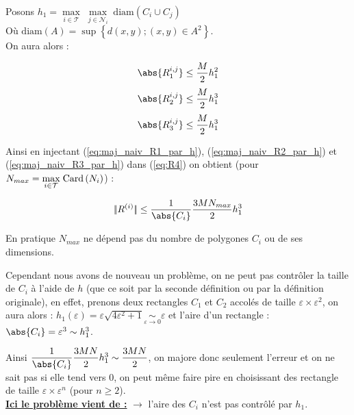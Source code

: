 \documentclass[12pt,a4paper]{article}
\begin{document}
	\noindent Posons $h_1 = \underset{i\in\mathcal T}\max\;\underset{j\in \mathcal N_i}\max\;\mathrm{diam}\left(C_i\cup C_j\right)$ \\
	Où $\mathrm{diam}(A) = \sup\left\{d(x,y); (x,y)\in A^2\right\}$.\\
	On aura alors :
	
	\begin{equation}\label{eq:maj_naiv_R1_par_h}
		\abs{R_1^{i,j}} \leq \dfrac {M}2h_1^2
	\end{equation}
	\begin{equation}\label{eq:maj_naiv_R2_par_h}
		\abs{R_2^{i,j}} \leq \dfrac{M}2h_1^3
	\end{equation}
	\begin{equation}\label{eq:maj_naiv_R3_par_h}
		\abs{R_3^{i,j}} \leq \dfrac{M}2 h_1^3
	\end{equation}
	
	
	Ainsi en injectant (\ref{eq:maj_naiv_R1_par_h}), (\ref{eq:maj_naiv_R2_par_h}) et (\ref{eq:maj_naiv_R3_par_h}) dans (\ref{eq:R4}) on obtient (pour $N_{max} = \underset{i\in\mathcal T}\max \hspace{.1cm}\text{Card}\left(N_i\right)$) :
	
	\begin{equation}\label{eq:max_naiv_R4}
		|\!| {R^{(i)}}|\!| \leq \frac1{\abs{C_i}}\frac{3MN_{max}}2h_1^3
	\end{equation}
	
	\vspace{-.2cm}
	
	En pratique $N_{max}$ ne dépend pas du nombre de polygones $C_i$ ou de ses dimensions.
	
	Cependant nous avons de nouveau un problème, on ne peut pas contrôler la taille de $C_i$ à l'aide de $h$ (que ce soit par la seconde définition ou par la définition originale), en effet, prenons deux rectangles $C_1$ et $C_2$ accolés de taille $\varepsilon\times\varepsilon^2$, on aura alors : $h_1(\varepsilon) = \varepsilon\sqrt{4\varepsilon^2+1} \underset{\varepsilon\to0}\sim \varepsilon$ et l'aire d'un rectangle : $\abs{C_i} = \varepsilon^3 \sim h_1^3$. 
	\par Ainsi $\dfrac1{\abs{C_i}}\dfrac{3MN}2h_1^3 \sim \dfrac{3MN}2$, on majore donc seulement l'erreur et on ne sait pas si elle tend vers 0, on peut même faire pire en choisissant des rectangle de taille $\varepsilon\times\varepsilon^n$ (pour $n \geq 2$).\\
	
	\textbf{\underline{Ici le problème vient de :}} $\longrightarrow$  l'aire des $C_i$ n'est pas contrôlé par $h_1$.\\
	
\end{document}
